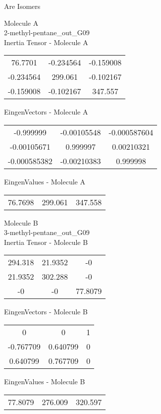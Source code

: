 \begin{center}
\vtab
\vtab
\textcolor{NavyBlue}{\Large Are Isomers}
\end{center}
\newpage
\begin{multicols}{2}
\begin{center}
Molecule A \\ 
2-methyl-pentane\_out\_G09
\\
Inertia Tensor - Molecule A \\
\vtab
\begin{tabular}{|c c c|}
76.7701	 & 	-0.234564	 & 	-0.159008	 \\
-0.234564	 & 	299.061	 & 	-0.102167	 \\
-0.159008	 & 	-0.102167	 & 	347.557
\end{tabular}

\vtab
 EingenVectors - Molecule A     \\
\vtab
\begin{tabular}{|c c c|}
-0.999999	 & 	-0.00105548	 & 	-0.000587604	 \\
-0.00105671	 & 	0.999997	 & 	0.00210321	 \\
-0.000585382	 & 	-0.00210383	 & 	0.999998
\end{tabular}

\vtab
 EingenValues - Molecule A     \\
\vtab
\begin{tabular}{|c c c|}
76.7698	 & 	299.061	 & 	347.558
\end{tabular}
\columnbreak

Molecule B \\ 
3-methyl-pentane\_out\_G09
\\
Inertia Tensor - Molecule B \\
\vtab
\begin{tabular}{|c c c|}
294.318	 & 	21.9352	 & 	-0	 \\
21.9352	 & 	302.288	 & 	-0	 \\
-0	 & 	-0	 & 	77.8079
\end{tabular}

\vtab
 EingenVectors - Molecule B     \\
\vtab
\begin{tabular}{|c c c|}
0	 & 	0	 & 	1	 \\
-0.767709	 & 	0.640799	 & 	0	 \\
0.640799	 & 	0.767709	 & 	0
\end{tabular}

\vtab
 EingenValues - Molecule B     \\
\vtab
\begin{tabular}{|c c c|}
77.8079	 & 	276.009	 & 	320.597
\end{tabular}

\end{center}
\end{multicols}
